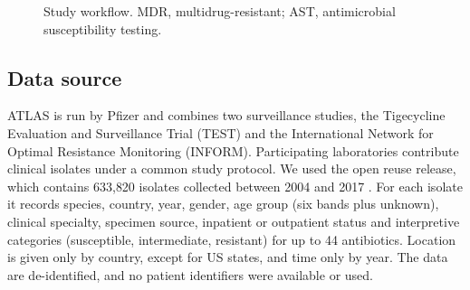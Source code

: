 \documentclass[11pt,a4paper]{article}
\begin{document}
\begin{figure}[t]
\centering
{}
\caption{Study workflow. MDR, multidrug-resistant; AST, antimicrobial susceptibility testing.}
\label{fig:workflow}
\end{figure}

\subsection{Data source}
ATLAS is run by Pfizer and combines two surveillance studies, the Tigecycline Evaluation and Surveillance Trial (TEST) and the International Network for Optimal Resistance Monitoring (INFORM). Participating laboratories contribute clinical isolates under a common study protocol. We used the open reuse release, which contains 633{,}820 isolates collected between 2004 and 2017 \cite{catalan2022,vivli}. For each isolate it records species, country, year, gender, age group (six bands plus unknown), clinical specialty, specimen source, inpatient or outpatient status and interpretive categories (susceptible, intermediate, resistant) for up to 44 antibiotics. Location is given only by country, except for US states, and time only by year. The data are de-identified, and no patient identifiers were available or used.
\end{document}
